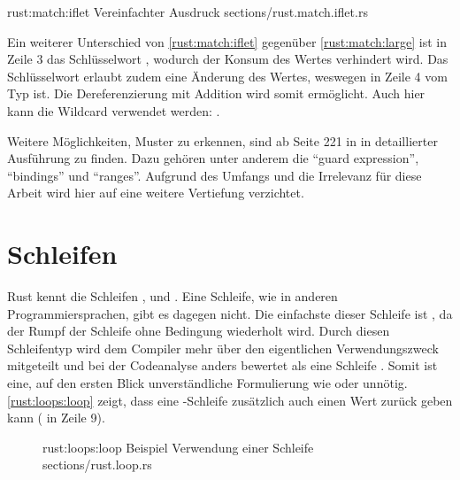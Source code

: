 \rustcinclude
	{rust:match:iflet}
	{Vereinfachter  Ausdruck}
	{sections/rust.match.iflet.rs}

Ein weiterer Unterschied von \autoref{rust:match:iflet} gegenüber \autoref{rust:match:large} ist in Zeile 3 das Schlüsselwort , wodurch der Konsum des Wertes verhindert wird.
Das Schlüsselwort  erlaubt zudem eine Änderung des Wertes, weswegen  in Zeile 4 vom Typ  ist.
Die Dereferenzierung mit Addition wird somit ermöglicht.
Auch hier kann die Wildcard verwendet werden: .

Weitere Möglichkeiten, Muster zu erkennen, sind ab Seite 221 in \cite{rust:orly_programming} in detaillierter Ausführung zu finden.
Dazu gehören unter anderem die \enquote{guard expression}, \enquote{bindings} und \enquote{ranges}.
Aufgrund des Umfangs und die Irrelevanz für diese Arbeit wird hier auf eine weitere Vertiefung verzichtet.

\section{Schleifen}


Rust kennt die Schleifen ,  und .
Eine  Schleife, wie in anderen Programmiersprachen, gibt es dagegen nicht.
Die einfachste dieser Schleife ist , da der Rumpf der Schleife ohne Bedingung wiederholt wird.
Durch diesen Schleifentyp wird dem Compiler mehr über den eigentlichen Verwendungszweck mitgeteilt und bei der Codeanalyse anders bewertet als eine  Schleife \cite{rust:book:loops}.
Somit ist eine, auf den ersten Blick unverständliche Formulierung wie  oder  unnötig.
\autoref{rust:loops:loop} zeigt, dass eine -Schleife zusätzlich auch einen Wert zurück geben kann ( in Zeile 9).

\begin{figure}[H]
\rustcinclude
	{rust:loops:loop}
	{Beispiel Verwendung einer  Schleife}
	{sections/rust.loop.rs}
\end{figure}


